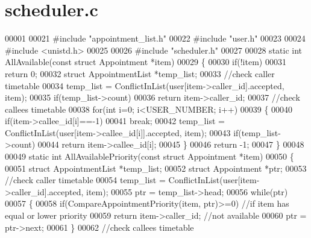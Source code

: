 \section{scheduler.\+c}
\label{scheduler_8c_source}

\begin{DoxyCode}
00001 
00021 \textcolor{preprocessor}{#include "appointment_list.h"}
00022 \textcolor{preprocessor}{#include "user.h"}
00023 
00024 \textcolor{preprocessor}{#include <unistd.h>}
00025 
00026 \textcolor{preprocessor}{#include "scheduler.h"}
00027 
00028 \textcolor{keyword}{static} \textcolor{keywordtype}{int} AllAvailable(\textcolor{keyword}{const} \textcolor{keyword}{struct} Appointment *item)
00029 \{
00030     \textcolor{keywordflow}{if}(!item)
00031         \textcolor{keywordflow}{return} 0;
00032     \textcolor{keyword}{struct }AppointmentList *temp\_list;
00033     \textcolor{comment}{//check caller timetable}
00034     temp\_list = ConflictInList(user[item->caller\_id].accepted, item);
00035     \textcolor{keywordflow}{if}(temp\_list->count)
00036         \textcolor{keywordflow}{return} item->caller\_id;
00037     \textcolor{comment}{//check callees timetable}
00038     \textcolor{keywordflow}{for}(\textcolor{keywordtype}{int} i=0; i<USER_NUMBER; i++)
00039     \{
00040         \textcolor{keywordflow}{if}(item->callee\_id[i]==-1)
00041             \textcolor{keywordflow}{break};
00042         temp\_list = ConflictInList(user[item->callee\_id[i]].accepted, item);
00043         \textcolor{keywordflow}{if}(temp\_list->count)
00044             \textcolor{keywordflow}{return} item->callee\_id[i];
00045     \}
00046     \textcolor{keywordflow}{return} -1;
00047 \}
00048 
00049 \textcolor{keyword}{static} \textcolor{keywordtype}{int} AllAvailablePriority(\textcolor{keyword}{const} \textcolor{keyword}{struct} Appointment *item)
00050 \{
00051     \textcolor{keyword}{struct }AppointmentList *temp\_list;
00052     \textcolor{keyword}{struct }Appointment *ptr;
00053     \textcolor{comment}{//check caller timetable}
00054     temp\_list = ConflictInList(user[item->caller\_id].accepted, item);
00055     ptr = temp\_list->head;
00056     \textcolor{keywordflow}{while}(ptr)
00057     \{
00058         \textcolor{keywordflow}{if}(CompareAppointmentPriority(item, ptr)>=0)    \textcolor{comment}{//if item has equal or lower priority}
00059             \textcolor{keywordflow}{return} item->caller\_id; \textcolor{comment}{//not available}
00060         ptr = ptr->next;
00061     \}
00062     \textcolor{comment}{//check callees timetable}

\end{DoxyCode}

